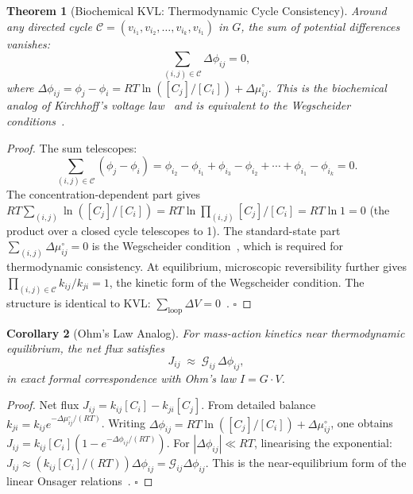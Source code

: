 \documentclass[twocolumn,10pt,a4paper]{article}
\newcommand{\Gcond}{\mathcal{G}}
\newtheorem{theorem}{Theorem}[section]
\newtheorem{corollary}[theorem]{Corollary}
\begin{document}
\begin{theorem}[Biochemical KVL: Thermodynamic Cycle Consistency]
\label{thm:kvl}
Around any directed cycle
$\mathcal{C}=(v_{i_1},v_{i_2},\ldots,v_{i_k},v_{i_1})$ in $G$, the sum of
potential differences vanishes:
\begin{equation}
  \sum_{(i,j)\in\mathcal{C}} \Delta\phi_{ij} = 0,
  \label{eq:kvl}
\end{equation}
where $\Delta\phi_{ij}=\phi_j-\phi_i=RT\ln([C_j]/[C_i])+\Delta\mu^\circ_{ij}$.
This is the biochemical analog of Kirchhoff's voltage law~\cite{Kirchhoff1845}
and is equivalent to the Wegscheider conditions~\cite{Wegscheider1901}.
\end{theorem}

\begin{proof}
The sum telescopes:
\[
\sum_{(i,j)\in\mathcal{C}}(\phi_j-\phi_i)
=\phi_{i_2}-\phi_{i_1}+\phi_{i_3}-\phi_{i_2}+\cdots+\phi_{i_1}-\phi_{i_k}=0.
\]
The concentration-dependent part gives
$RT\sum_{(i,j)}\ln([C_j]/[C_i])=RT\ln\prod_{(i,j)}[C_j]/[C_i]=RT\ln 1=0$
(the product over a closed cycle telescopes to 1).  The standard-state part
$\sum_{(i,j)}\Delta\mu^\circ_{ij}=0$ is the Wegscheider
condition~\cite{Wegscheider1901,Schuster1991}, which is required for
thermodynamic consistency.  At equilibrium, microscopic reversibility further
gives $\prod_{(i,j)\in\mathcal{C}}k_{ij}/k_{ji}=1$, the kinetic form of the
Wegscheider condition.  The structure is identical to KVL:
$\sum_{\mathrm{loop}}\Delta V=0$~\cite{Kirchhoff1845}.  $\square$
\end{proof}

\begin{corollary}[Ohm's Law Analog]
\label{cor:ohm}
For mass-action kinetics near thermodynamic equilibrium, the net flux satisfies
\begin{equation}
  J_{ij}\;\approx\;\Gcond_{ij}\,\Delta\phi_{ij},
\end{equation}
in exact formal correspondence with Ohm's law $I=G\cdot V$.
\end{corollary}

\begin{proof}
Net flux $J_{ij}=k_{ij}[C_i]-k_{ji}[C_j]$.
From detailed balance $k_{ji}=k_{ij}e^{-\Delta\mu^\circ_{ij}/(RT)}$.
Writing $\Delta\phi_{ij}=RT\ln([C_j]/[C_i])+\Delta\mu^\circ_{ij}$,
one obtains $J_{ij}=k_{ij}[C_i](1-e^{-\Delta\phi_{ij}/(RT)})$.
For $|\Delta\phi_{ij}|\ll RT$, linearising the exponential:
$J_{ij}\approx(k_{ij}[C_i]/(RT))\Delta\phi_{ij}=\Gcond_{ij}\Delta\phi_{ij}$.
This is the near-equilibrium form of the linear Onsager relations~\cite{Onsager1931}.
$\square$
\end{proof}
\end{document}
